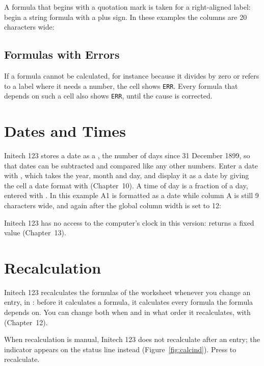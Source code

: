 A formula that begins with a quotation mark is taken for a right-aligned
label: begin a string formula with a plus sign.  In these examples the
columns are 20 characters wide:


\subsection{Formulas with Errors}
If a formula cannot be calculated, for instance because it divides by zero
or refers to a label where it needs a number, the cell shows \texttt{ERR}.
Every formula that depends on such a cell also shows \texttt{ERR}, until the
cause is corrected.

\section{Dates and Times}
Initech 123 stores a date as a , the number of
days since 31 December 1899, so that dates can be subtracted and compared
like any other numbers.  Enter a date with , which takes the
year, month and day, and display it as a date by giving the cell a date
format with  (Chapter~10).  A time of day is
a fraction of a day, entered with .  In this example A1 is
formatted as a date while column A is still 9 characters wide, and again
after the global column width is set to 12:


Initech 123 has no access to the computer's clock in this version:
 returns a fixed value (Chapter~13).

\section{Recalculation}
Initech 123 recalculates the formulas of the worksheet whenever you change
an entry, in : before it calculates a formula, it
calculates every formula the formula depends on.  You can change both when
and in what order it recalculates, with
 (Chapter~12).

When recalculation is manual, Initech 123 does not recalculate after an
entry; the  indicator appears on the status line instead
(Figure~\ref{fig:calcind}).  Press  to recalculate.


